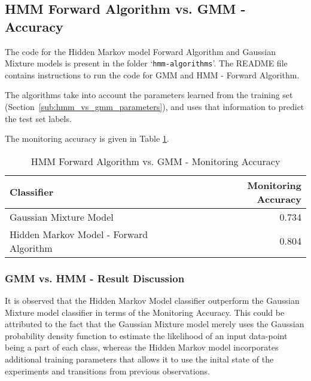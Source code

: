 \documentclass[parskip=half]{scrartcl}
\begin{document}


    \subsection{HMM Forward Algorithm vs. GMM - Accuracy} %
    \label{sub:hmm_forward_algorithm_vs_gmm_accuracy}

        The code for the Hidden Markov model Forward Algorithm and Gaussian Mixture models is present in the folder `\texttt{hmm-algorithms}'. The README file contains instructions to run the code for GMM and HMM - Forward Algorithm.

        The algorithms take into account the parameters learned from the training set (Section~\ref{sub:hmm_vs_gmm_parameters}), and uses that information to predict the test set labels.

        The monitoring accuracy is given in Table \ref{tab:hmm-forward-algorithm-vs-gmm-monitoring-accuracy}.

        \begin{table}[ht]
            \centering
            \begin{tabular}{| l | r |}
            \hline
            \textbf{Classifier} & \textbf{Monitoring Accuracy} \\
            \hline
            \hline
                Gaussian Mixture Model & 0.734 \\
            \hline
                Hidden Markov Model - Forward Algorithm & 0.804 \\
            \hline
            \end{tabular}
            \caption{HMM Forward Algorithm vs. GMM - Monitoring Accuracy}
            \label{tab:hmm-forward-algorithm-vs-gmm-monitoring-accuracy}
        \end{table}

        \subsubsection*{GMM vs. HMM - Result Discussion} %
        \label{ssub:gmm_vs_hmm_result_discussion}

            It is observed that the Hidden Markov Model classifier outperform the Gaussian Mixture model classifier in terms of the Monitoring Accuracy. This could be attributed to the fact that the Gaussian Mixture model merely uses the Gaussian probability density function to estimate the likelihood of an input data-point being a part of each class, whereas the Hidden Markov model incorporates additional training parameters that allows it to use the inital state of the experiments and transitions from previous observations. 
\end{document}

